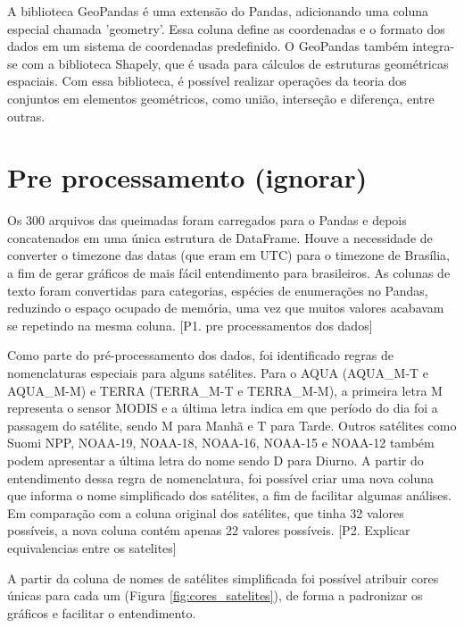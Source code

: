 \documentclass[cic,tc]{iiufrgs}
\begin{document}
A biblioteca GeoPandas é uma extensão do Pandas, adicionando uma coluna especial chamada 'geometry'. Essa coluna define as coordenadas e o formato dos dados em um sistema de coordenadas predefinido. O GeoPandas também integra-se com a biblioteca Shapely, que é usada para cálculos de estruturas geométricas espaciais. Com essa biblioteca, é possível realizar operações da teoria dos conjuntos em elementos geométricos, como união, interseção e diferença, entre outras. \par


\section{Pre processamento (ignorar)}

Os 300 arquivos das queimadas foram carregados para o Pandas e depois concatenados
em uma única estrutura de DataFrame. Houve a necessidade de converter o timezone 
das datas (que eram em UTC) para o timezone de Brasília, a fim de gerar gráficos 
de mais fácil entendimento para brasileiros. As colunas de texto foram convertidas 
para categorias, espécies de enumerações no Pandas, reduzindo o espaço ocupado 
de memória, uma vez que muitos valores acabavam se repetindo na mesma coluna. 
[P1. pre processamentos dos dados]\par

Como parte do pré-processamento dos dados, foi identificado regras de nomenclaturas 
especiais para alguns satélites. Para o AQUA (AQUA\_M-T e AQUA\_M-M) e TERRA 
(TERRA\_M-T e TERRA\_M-M), a primeira letra M representa o sensor MODIS e a última
letra indica em que período do dia foi a passagem do satélite, sendo M para Manhã 
e T para Tarde. Outros satélites como Suomi NPP, NOAA-19, NOAA-18, NOAA-16, NOAA-15 
e NOAA-12 também podem apresentar a última letra do nome sendo D para Diurno.
A partir do entendimento dessa regra de nomenclatura, foi possível criar uma nova 
coluna que informa o nome simplificado dos satélites, a fim de facilitar 
algumas análises. Em comparação com a coluna original dos satélites, que tinha 32 
valores possíveis, a nova coluna contém apenas 22 valores possíveis.
[P2. Explicar equivalencias entre os satelites] \par

A partir da coluna de nomes de satélites simplificada foi possível atribuir cores 
únicas para cada um (Figura \ref{fig:cores_satelites}), de forma a padronizar os 
gráficos e facilitar o entendimento.
\end{document}
